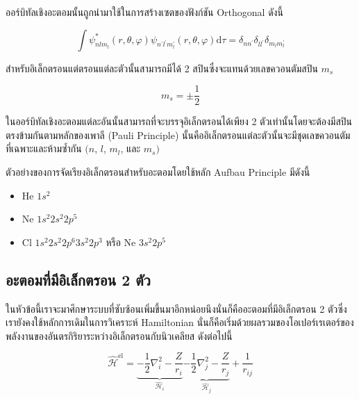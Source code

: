 ออร์บิทัลเชิงอะตอมนั้นถูกนำมาใช้ในการสร้างเซตของฟังก์ชัน Orthogonal ดังนี้

\begin{equation}
    \int \psi_{nlm_{l}}^{*} (r, \theta, \varphi)
    \psi_{n^{\prime} l^{\prime} m^{\prime}_{l}} (r, \theta, \varphi)
    \mathrm{d} \tau
    = \delta_{n n^{\prime}}
    \delta_{l l^{\prime}}
    \delta_{m_{l} m_{l}^{\prime}}
\end{equation}

\noindent สำหรับอิเล็กตรอนแต่ตรอนแต่ละตัวนั้นสามารถมีได้ 2 สปินซึ่งจะแทนด้วยเลขควอนตัมสปิน $m_{s}$

\begin{equation}
    m_{s} = \pm \frac{1}{2}
\end{equation}

ในออร์บิทัลเชิงอะตอมแต่ละอันนั้นสามารถที่จะบรรจุอิเล็กตรอนได้เพียง 2 ตัวเท่านั้นโดยจะต้องมีสปินตรงข้ามกันตามหลักของเพาลี (Pauli Principle)
นั้นคืออิเล็กตรอนแต่ละตัวนั้นจะมีชุดเลขควอนตัมที่เฉพาะและห้ามซ้ำกัน $(n$, $l$, $m_{l}$, และ $m_{s})$

ตัวอย่างของการจัดเรียงอิเล็กตรอนสำหรับอะตอมโดยใช้หลัก Aufbau Principle มีดังนี้

\begin{itemize}[topsep=0pt,noitemsep]
    \setlength\itemsep{1em}
    \item He $1s^{2}$

    \item Ne $1s^{2} 2s^{2} 2p^{5}$

    \item Cl $1s^{2} 2s^{2} 2p^{6} 3s^{2} 2p^{3}$ หรือ Ne $3s^{2} 2p^{5}$
\end{itemize}

\subsection{อะตอมที่มีอิเล็กตรอน 2 ตัว}

ในหัวข้อนี้เราจะมาศึกษาระบบที่ซับซ้อนเพิ่มขึ้นมาอีกหน่อยนึงนั่นก็คืออะตอมที่มีอิเล็กตรอน 2 ตัวซึ่งเรายังคงใช้หลักการเดิมในการวิเคราะห์ Hamiltonian
นั่นก็คือเริ่มด้วยผลรวมของโอเปอร์เรเตอร์ของพลังงานของอันตรกิริยาระหว่างอิเล็กตรอนกับนิวเคลียส ดังต่อไปนี้

\begin{equation}
    \hat{\mathscr{H}}^{\text{el}}
    =
    \underbrace
    {
        -\frac{1}{2} \nabla^{2}_{i}
        -\frac{Z}{r_{i}}
    }_
    {
        \hat{\mathscr{H}}_{i}
    }
    \underbrace
    {
        -\frac{1}{2} \nabla^{2}_{j}
        -\frac{Z}{r_{j}}
    }_
    {
        \hat{\mathscr{H}}_{j}
    }
    + \frac{1}{r_{ij}}
\end{equation}

